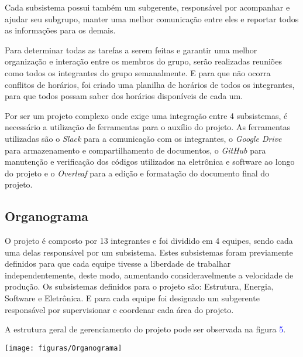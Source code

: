 	Cada subsistema possui também um subgerente, responsável por acompanhar e ajudar seu subgrupo, manter uma melhor comunicação entre eles e reportar todos as informações para os demais.
    
	Para determinar todas as tarefas a serem feitas e garantir uma melhor organização e interação entre os membros do grupo, serão realizadas reuniões como todos os integrantes do grupo semanalmente. E para que não ocorra conflitos de horários, foi criado uma planilha de horários de todos os integrantes, para que todos possam saber dos horários disponíveis de cada um. 
    
	Por ser um projeto complexo onde exige uma integração entre 4 subsistemas, é necessário a utilização de ferramentas para o auxílio do projeto. As ferramentas utilizadas são o \textit{Slack} para a comunicação com os integrantes, o \textit{Google Drive} para armazenamento e compartilhamento de documentos, o \textit{GitHub} para manutenção e verificação dos códigos utilizados na eletrônica e software ao longo do projeto e o \textit{Overleaf} para a edição e formatação do documento final do projeto.

\subsection{Organograma}

	O projeto é composto por 13 integrantes e foi dividido em 4 equipes, sendo cada uma delas responsável por um subsistema. Estes subsistemas foram previamente definidos para que cada equipe tivesse a liberdade de trabalhar independentemente, deste modo, aumentando consideravelmente a velocidade de produção. Os subsistemas definidos para o projeto são: Estrutura, Energia, Software e Eletrônica. E para cada equipe foi designado um subgerente responsável por supervisionar e coordenar cada área do projeto.
    
	A estrutura geral de gerenciamento do projeto pode ser observada na figura \textcolor{blue}{5}.
    
\begin{center}
	\texttt{[image: figuras/Organograma]}
\end{center} 
    

    
    

